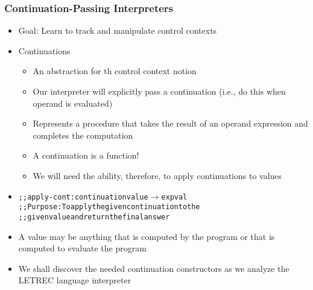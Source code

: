 \documentclass{beamer}
\newcommand{\arrow}{\(\rightarrow\)}
\begin{document}
\begin{frame}[fragile]
\frametitle{Continuation-Passing Interpreters}
\begin{scriptsize}
\begin{itemize}
\item<1-> Goal: Learn to track and manipulate control contexts

\item<2-> Continuations
\begin{itemize}
\item An abstraction for th control context notion

\item Our interpreter will explicitly pass a continuation (i.e., do this when operand is evaluated)

\item Represents a procedure that takes the result of an operand expression and completes the computation

\item A continuation is a function!

\item We will need the ability, therefore, to apply continuations to values
\end{itemize}

\item<3->
\begin{alltt}
;; apply-cont: continuation value \arrow{} expval
;; Purpose: To apply the given continuation to the
;;          given value and return the final answer
\end{alltt}

\item<3-> A value may be anything that is computed by the program or that is computed to evaluate the program

\item<4-> We shall discover the needed continuation constructors as we analyze the LETREC language interpreter

\end{itemize}
\end{scriptsize}
\end{frame}
\end{document}
